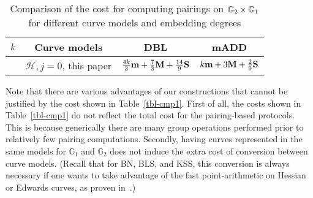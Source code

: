 \begin{table}[h]
\centering
\caption{Comparison of the cost for computing pairings on $\mathbb{G}_{2} \times \mathbb{G}_{1}$ for different curve models and embedding degrees}

\begin{tabular}{ l | l | l | l}
\hline
\multicolumn{1}{c|}{$k$}
&\multicolumn{1}{c|}{Curve models}	&\multicolumn{1}{c|}{DBL}	&\multicolumn{1}{c}{mADD}	\\
\hline
& $\mathcal{H},j=0$, this paper
& $\frac{4k}{3}\textbf{m} + \frac{7}{3}\textbf{M} + \frac{14}{9}\textbf{S} $
& $k\textbf{m} + 3\textbf{M} + \frac{2}{9}\textbf{S}$ \\
\hline
\end{tabular}
\label{tbl-cmp2}


\end{table}

Note that there are various advantages of our constructions that cannot be justified by the cost shown in Table~\ref{tbl-cmp1}.
First of all, the costs shown in Table~\ref{tbl-cmp1} do not reflect the total cost for the pairing-based protocols.
This is because generically there are many group operations performed prior to relatively few pairing computations.
Secondly, having curves represented in the same models for $\mathbb{G}_1$ and $\mathbb{G}_2$ does not induce the extra cost of conversion between curve models.
(Recall that for BN, BLS, and KSS, this conversion is always necessary if one wants to take advantage of
the fast point-arithmetic on Hessian or Edwards curves, as proven in~\cite{2013/bos-pairing}.)


